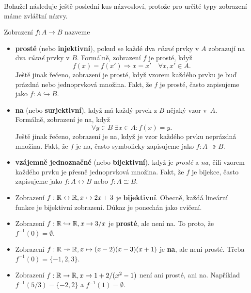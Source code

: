 Bohužel následuje ještě poslední kus názvosloví, protože pro určité
 typy zobrazení máme zvláštní názvy.

\begin{definition}
 Zobrazení $f:A \to B$ nazveme
 \begin{itemize}
  \item \textbf{prosté} (nebo \textbf{injektivní}), pokud se každé dva
   \emph{různé }prvky v $A$ zobrazují na dva \emph{různé} prvky v $B$. Formálně,
   zobrazení $f$ je prosté, když
   \[
    f(x) = f(x') \Rightarrow x = x' \quad  \forall x,x' \in A.
   \]
   Ještě jinak řečeno, zobrazení je prosté, když vzorem každého prvku je buď
   prázdná nebo jednoprvková množina. Fakt, že $f$ je prosté, často zapisujeme
   jako $f:A \hookrightarrow B$.
  \item \textbf{na} (nebo \textbf{surjektivní}), když má každý prvek z $B$ 
   nějaký vzor v~$A$. Formálně, zobrazení je na, když
   \[
    \forall y \in B \; \exists x \in A: f(x) = y.
   \]
   Ještě jinak řečeno, zobrazení je na, když je vzor každého prvku neprázdná
   množina. Fakt, že $f$ je na, často symbolicky zapisujeme jako ${f:A
   \twoheadrightarrow B}$.
  \item \textbf{vzájemně jednoznačné} (nebo \textbf{bijektivní}), když je
   \emph{prosté} a \emph{na}, čili vzorem každého prvku je přesně jednoprvková
   množina. Fakt, že $f$ je bijekce, často zapisujeme jako $f:A \leftrightarrow
   B$ nebo $f: A \cong B$.
 \end{itemize}
\end{definition}

\begin{example}
 \hfill
 \vspace*{-.5\parskip}
 \begin{itemize}
  \item Zobrazení $f:\mathbb{R} \leftrightarrow \mathbb{R}, x \mapsto 2x + 3$ je
   \textbf{bijektivní}. Obecně, každá lineární funkce je bijektivní zobrazení.
   Důkaz je ponechán jako cvičení.
  \item Zobrazení $f:\mathbb{R} \hookrightarrow \mathbb{R}, x \mapsto 3 / x$ je \textbf{prosté},
   ale není na. To proto, že $f^{-1}(0) = \emptyset$.
  \item Zobrazení $f:\mathbb{R} \twoheadrightarrow \mathbb{R}, x \mapsto (x-2)(x-3)(x+1)$ je
   \textbf{na}, ale není prosté. Třeba $f^{-1}(0) = \{-1,2,3\}$.
  \item Zobrazení $f:\mathbb{R} \to \mathbb{R}, x \mapsto 1 + 2 / (x^2 - 1)$ není ani prosté,
   ani na. Například $f^{-1}(5 / 3) = \{-2,2\}$ a $f^{-1}(1) = \emptyset$.
 \end{itemize}
\end{example}

